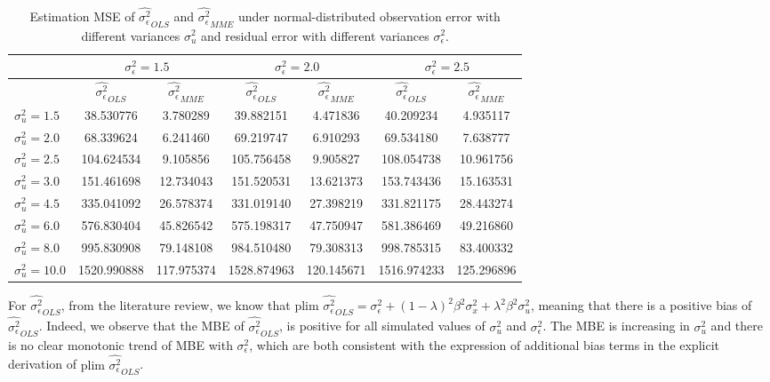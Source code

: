 \documentclass{article}
\begin{document}
\begin{table}[ht]
    \centering
    \caption{Estimation MSE of $\hat{\sigma^2_\epsilon}_{OLS}$ and $\hat{\sigma^2_\epsilon}_{MME}$ under normal-distributed observation error with different variances $\sigma^2_u$ and residual error with different variances $\sigma^2_\epsilon$.}
    \label{Tab:MSE_sigma_normal}
    \begin{tabular}[t]{lcccccc}
        \hline
        &\multicolumn{2}{c}{$\sigma^2_\epsilon=1.5$}&\multicolumn{2}{c}{$\sigma^2_\epsilon=2.0$}&\multicolumn{2}{c}{$\sigma^2_\epsilon=2.5$}\\
        \hline
        &$\hat{\sigma^2_\epsilon}_{OLS}$&$\hat{\sigma^2_\epsilon}_{MME}$&$\hat{\sigma^2_\epsilon}_{OLS}$&
        $\hat{\sigma^2_\epsilon}_{MME}$&$\hat{\sigma^2_\epsilon}_{OLS}$&$\hat{\sigma^2_\epsilon}_{MME}$\\ 
        \hline
        $\sigma^2_u = 1.5$&38.530776&3.780289&39.882151&4.471836&40.209234&4.935117\\
        $\sigma^2_u = 2.0$&68.339624&6.241460&69.219747&6.910293&69.534180&7.638777\\
        $\sigma^2_u = 2.5$&104.624534&9.105856&105.756458&9.905827&108.054738&10.961756\\
        $\sigma^2_u = 3.0$&151.461698&12.734043&151.520531&13.621373&153.743436&15.163531\\
        $\sigma^2_u = 4.5$&335.041092&26.578374&331.019140&27.398219&331.821175&28.443274\\
        $\sigma^2_u = 6.0$&576.830404&45.826542&575.198317&47.750947&581.386469&49.216860\\
        $\sigma^2_u = 8.0$&995.830908&79.148108&984.510480&79.308313&998.785315&83.400332\\
        $\sigma^2_u = 10.0$&1520.990888&117.975374&1528.874963&120.145671&1516.974233&125.296896\\
        \hline
    \end{tabular}
\end{table}

For $\hat{\sigma^2_\epsilon}_{OLS}$, from the literature review, we know that $\textrm{plim } \hat{\sigma^2_\epsilon}_{OLS} = \sigma_\epsilon^2 + (1-\lambda)^2 \beta^2 \sigma_x^2 + \lambda^2 \beta^2 \sigma_u^2$, meaning that there is a positive bias of $\hat{\sigma^2_\epsilon}_{OLS}$. 
Indeed, we observe that the MBE of $\hat{\sigma^2_\epsilon}_{OLS}$, is positive for all simulated values of $\sigma^2_u$ and $\sigma^2_\epsilon$.
The MBE is increasing in $\sigma^2_u$ and there is no clear monotonic trend of MBE with $\sigma^2_\epsilon$, which are both consistent with the expression of additional bias terms in the explicit derivation of $\textrm{plim } \hat{\sigma^2_\epsilon}_{OLS}$.
\end{document}
